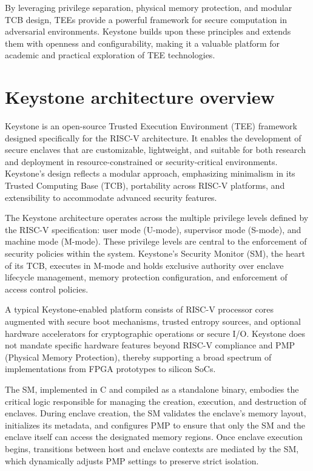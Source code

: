 By leveraging privilege separation, physical memory protection, and modular TCB design, TEEs provide a powerful framework for secure computation in adversarial environments. Keystone builds upon these principles and extends them with openness and configurability, making it a valuable platform for academic and practical exploration of TEE technologies.

\section{Keystone architecture overview}

Keystone is an open-source Trusted Execution Environment (TEE) framework designed specifically for the RISC-V architecture. It enables the development of secure enclaves that are customizable, lightweight, and suitable for both research and deployment in resource-constrained or security-critical environments. Keystone’s design reflects a modular approach, emphasizing minimalism in its Trusted Computing Base (TCB), portability across RISC-V platforms, and extensibility to accommodate advanced security features.

The Keystone architecture operates across the multiple privilege levels defined by the RISC-V specification: user mode (U-mode), supervisor mode (S-mode), and machine mode (M-mode). These privilege levels are central to the enforcement of security policies within the system. Keystone's Security Monitor (SM), the heart of its TCB, executes in M-mode and holds exclusive authority over enclave lifecycle management, memory protection configuration, and enforcement of access control policies.

A typical Keystone-enabled platform consists of RISC-V processor cores augmented with secure boot mechanisms, trusted entropy sources, and optional hardware accelerators for cryptographic operations or secure I/O. Keystone does not mandate specific hardware features beyond RISC-V compliance and PMP (Physical Memory Protection), thereby supporting a broad spectrum of implementations from FPGA prototypes to silicon SoCs.

The SM, implemented in C and compiled as a standalone binary, embodies the critical logic responsible for managing the creation, execution, and destruction of enclaves. During enclave creation, the SM validates the enclave's memory layout, initializes its metadata, and configures PMP to ensure that only the SM and the enclave itself can access the designated memory regions. Once enclave execution begins, transitions between host and enclave contexts are mediated by the SM, which dynamically adjusts PMP settings to preserve strict isolation.

